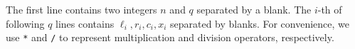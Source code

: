 The first line contains two integers $n$ and $q$ separated by a blank.
The $i$-th of following $q$ lines contains $\ell_i, r_i, c_i, x_i$
separated by blanks. For convenience, we use \verb+*+ and \verb+/+ to represent
multiplication and division operators, respectively.
